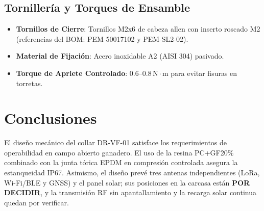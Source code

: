 \subsection{Tornillería y Torques de Ensamble}

\begin{itemize}[leftmargin=*]
    \item \textbf{Tornillos de Cierre}: Tornillos M2x6 de cabeza allen con inserto roscado M2 (referencias del BOM: PEM 50017102 y PEM-SL2-02).
    \item \textbf{Material de Fijación}: Acero inoxidable A2 (AISI 304) pasivado.
    \item \textbf{Torque de Apriete Controlado}: $0.6\text{--}0.8\,\text{N}\cdot\text{m}$ para evitar fisuras en torretas.
\end{itemize}

\section{Conclusiones}

El diseño mecánico del collar DR-VF-01 satisface los requerimientos de operabilidad en campo abierto ganadero. El uso de la resina PC+GF20\% combinado con la junta tórica EPDM en compresión controlada asegura la estanqueidad IP67. Asimismo, el diseño prevé tres antenas independientes (LoRa, Wi-Fi/BLE y GNSS) y el panel solar; sus posiciones en la carcasa están \textbf{POR DECIDIR}, y la transmisión RF sin apantallamiento y la recarga solar continua quedan por verificar.